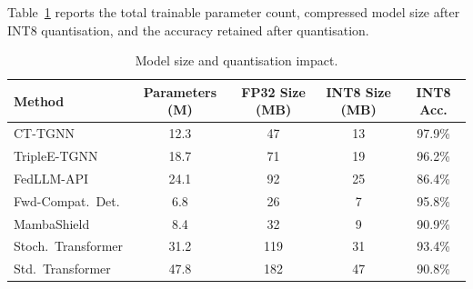 Table~\ref{tab:app_params} reports the total trainable parameter count, compressed model size after INT8 quantisation, and the accuracy retained after quantisation.

\begin{table}[htbp]
\centering
\caption{Model size and quantisation impact.}
\label{tab:app_params}
\begin{tabular}{lcccc}
\toprule
Method & Parameters (M) & FP32 Size (MB) & INT8 Size (MB) & INT8 Acc. \\
\midrule
CT-TGNN            & 12.3 & 47  & 13 & 97.9\% \\
TripleE-TGNN       & 18.7 & 71  & 19 & 96.2\% \\
FedLLM-API         & 24.1 & 92  & 25 & 86.4\% \\
Fwd-Compat.\ Det.            & 6.8  & 26  & 7  & 95.8\% \\
MambaShield        & 8.4  & 32  & 9  & 90.9\% \\
Stoch.\ Transformer & 31.2 & 119 & 31 & 93.4\% \\
\midrule
Std.\ Transformer  & 47.8 & 182 & 47 & 90.8\% \\
\bottomrule
\end{tabular}
\end{table}
